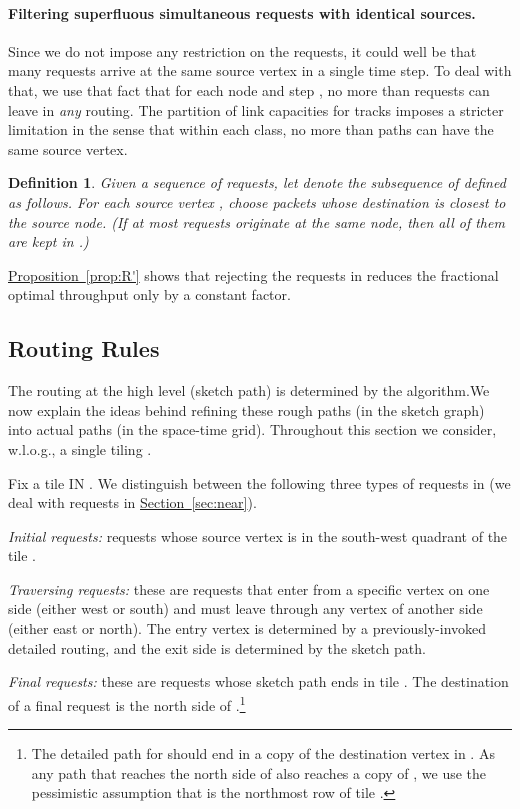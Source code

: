 \documentclass[11pt]{article}
\newtheorem{definition}[theorem]{Definition}
\newcommand{\namedref}[2]{\hyperref[#2]{#1~\ref*{#2}}}
\newcommand{\sectionref}[1]{\namedref{Section}{#1}}
\newcommand{\propref}[1]{\namedref{Proposition}{#1}}
\newenvironment{proof sketch}[1]{\noindent {\emph{Proof sketch of #1:}}}{\hfill \qed}
\newcommand{\near}{\text{\emph{Near}}\xspace}
\begin{document}
\paragraph{Filtering superfluous simultaneous requests with identical sources\ifnum{}.\fi}
Since we do not impose any restriction on the requests, it could well be that many
requests arrive at the same source vertex in a single time step. To deal with that,
we use that fact that for each node  and step , no more than  requests can
leave  in \emph{any} routing. The partition of link capacities for tracks
imposes a stricter limitation in the sense that within each class, no more than
 paths can have the same source vertex.
\begin{definition}\label{def:R'}
  Given a sequence  of requests, let  denote the subsequence of  defined as
  follows.  For each source vertex , choose 
  packets whose destination is closest to the source node. (If at most 
  requests originate at the same node, then all of them are kept
  in .)
\end{definition}
\noindent
\propref{prop:R'} shows that rejecting the requests in  reduces the
fractional optimal throughput only by a constant factor.
\subsection{Routing Rules}
The routing at the high level (sketch path) is determined by the
 algorithm.We now explain the
ideas behind refining these rough paths (in the sketch graph) into
actual paths (in the space-time grid). Throughout this section we
consider, w.l.o.g.,  a single tiling .

Fix a tile  IN . We distinguish between the following three types of requests in
 (we deal with \near requests in \sectionref{sec:near}).
\begin{compactitem}
\item \emph{Initial requests:} requests whose source vertex is in the
  south-west
  quadrant of the tile .
\item \emph{Traversing requests:} these are requests that enter  from a
  specific vertex on one side (either west or south) and must leave
  through any vertex of another side (either east or north).  The
  entry vertex is determined by a previously-invoked detailed routing,
  and the exit side is determined by the sketch path.
\item \emph{Final requests:} these are requests whose sketch path ends in
  tile .  The destination of a final request is the north side of
  .\footnote{The detailed path for  should end in a copy of the
    destination vertex  in . As any path that reaches the
    north side of  also reaches a copy of , we use the
    pessimistic assumption that  is the northmost row of
    tile .}
\end{compactitem}
\end{document}
